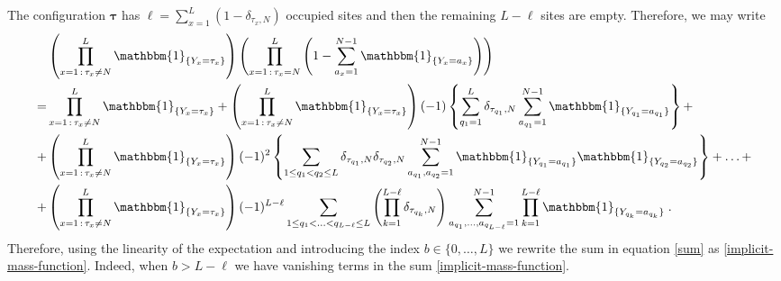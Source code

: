 \documentclass[10pt]{article}
\numberwithin{equation}{section}
\numberwithin{equation}{subsection}
\newcommand{\dt}{\;.}
\begin{document}
The configuration $\bm{\tau}$ has $\ell=\sum_{x=1}^{L}(1-\delta_{\tau_{x},N})$ occupied sites and then the remaining $L-\ell$ sites are empty. %
Therefore, we may write
\begin{align}\label{sum}
&\left(\prod_{x=1\,:\,\tau_{x}\neq N}^{L}\mathbbm{1}_{\{Y_x=\tau_{x}\}}\right)\left(\prod_{x=1\,:\,\tau_{x}=N}^{L}\left(1-\sum_{a_{x}=1}^{N-1}\mathbbm{1}_{\{Y_x=a_{x}\}}\right)\right)\nonumber\\
=&
\prod_{x=1\,:\,\tau_{x}\neq N}^{L}\mathbbm{1}_{\{Y_x=\tau_{x}\}}+\left(\prod_{x=1\,:\,\tau_{x}\neq N}^{L}\mathbbm{1}_{\{Y_x=\tau_{x}\}}\right)(-1)\left\{\sum_{q_{1}=1}^{L}\delta_{\tau_{q_{1}},N}\sum_{a_{q_{1}}=1}^{N-1}\mathbbm{1}_{\{Y_{q_{1}}=a_{q_{1}}\}}\right\}+\nonumber\\
+&\left(\prod_{x=1\,:\,\tau_{x}\neq N}^{L}\mathbbm{1}_{\{Y_x=\tau_{x}\}}\right)(-1)^{2}\left\{\sum_{1\leq q_{1}<q_{2}\leq L}\delta_{\tau_{q_{1}},N}\delta_{\tau_{q_{2}},N}\sum_{a_{q_{1}},a_{q_{2}}=1}^{N-1}\mathbbm{1}_{\{Y_{q_{1}}=a_{q_{1}}\}}\mathbbm{1}_{\{Y_{q_{2}}=a_{q_{2}}\}}\right\}+\ldots+\nonumber\\
+&\left(\prod_{x=1\,:\,\tau_{x}\neq N}^{L}\mathbbm{1}_{\{Y_x=\tau_{x}\}}\right)(-1)^{L-\ell}\sum_{1\leq q_{1}<\ldots<q_{L-\ell}\leq L}\left(\prod_{k=1}^{L-\ell}\delta_{\tau_{q_{k}},N}\right)\sum_{a_{q_{1}},\ldots,a_{q_{L-\ell}}=1}^{N-1}\prod_{k=1}^{L-\ell}\mathbbm{1}_{\{Y_{q_{k}}=a_{q_{k}}\}}\dt
\end{align} 
Therefore, using the linearity of the expectation and introducing the index $b\in \{0,\ldots,L\}$ {\color{blue} we rewrite the sum in equation \eqref{sum} as} \eqref{implicit-mass-function}.{\color{blue} Indeed, when $b>L-\ell$ we have vanishing terms in the sum \eqref{implicit-mass-function}.}
\end{document}
